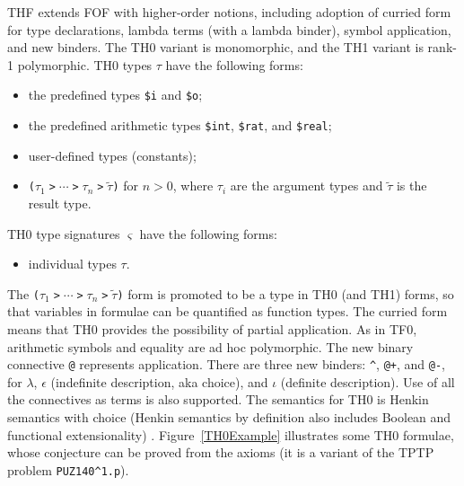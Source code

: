 \documentclass{easychair}
\begin{document}
THF extends FOF with higher-order notions, including adoption of curried 
form for type declarations, lambda terms (with a lambda binder), symbol 
application, and new binders.
The TH0 variant is monomorphic, and the TH1 variant is rank-1 polymorphic.
TH0 types $\tau$ have the following forms:
\begin{itemize}
\item the predefined types {\tt \$i} and {\tt \$o};
\item the predefined arithmetic types {\tt \$int}, {\tt \$rat}, and 
      {\tt \$real};
\item user-defined types (constants);
\item {\tt ($\tau_1\;$>$\;{\cdots}\;$>$\;\tau_n\;$>$\;\tilde \tau$)}
      for $n > 0$, where $\tau_i$ are the argument types and $\tilde \tau$
      is the result type.
\end{itemize}
TH0 type signatures $\varsigma$ have the following forms:
\begin{itemize}
\item individual types $\tau$.
\end{itemize}
The {\tt ($\tau_1\;$>$\;{\cdots}\;$>$\;\tau_n\;$>$\;\tilde \tau$)}
form is promoted to be a type in TH0 (and TH1) forms, so that variables in
formulae can be quantified as function types.
The curried form means that TH0 provides the possibility of partial
application.
As in TF0, arithmetic symbols and equality are ad hoc polymorphic.
The new binary connective {\tt @} represents application.
There are three new binders: {\tt \verb|^|}, {\tt @+}, and {\tt @-}, for
$\lambda$, $\epsilon$ (indefinite description, aka choice), and $\iota$
(definite description).
Use of all the connectives as terms is also supported.
The semantics for TH0 is Henkin semantics with choice (Henkin semantics
by definition also includes Boolean and functional extensionality)
\cite{BBK04,Hen50}.
Figure~\ref{TH0Example} illustrates some TH0 formulae, whose conjecture can
be proved from the axioms (it is a variant of the TPTP problem
{\tt PUZ140\verb|^|1.p}).
\end{document}
